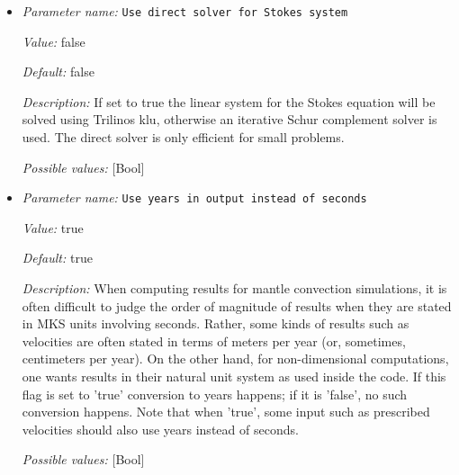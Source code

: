 \begin{itemize}
{\it Value:} false


{\it Default:} false


{\it Description:} Mantle convection simulations are often focused on convection dominated systems. However, these codes can also be used to investigate systems where heat conduction plays a dominant role. This parameter indicates whether the simulator should also use heat conduction in determining the length of each time step.


{\it Possible values:} [Bool]
\item {\it Parameter name:} {\tt Use direct solver for Stokes system}
\label{parameters:Use direct solver for Stokes system}


{\it Value:} false


{\it Default:} false


{\it Description:} If set to true the linear system for the Stokes equation will be solved using Trilinos klu, otherwise an iterative Schur complement solver is used. The direct solver is only efficient for small problems.


{\it Possible values:} [Bool]
\item {\it Parameter name:} {\tt Use years in output instead of seconds}
\label{parameters:Use years in output instead of seconds}


{\it Value:} true


{\it Default:} true


{\it Description:} When computing results for mantle convection simulations, it is often difficult to judge the order of magnitude of results when they are stated in MKS units involving seconds. Rather, some kinds of results such as velocities are often stated in terms of meters per year (or, sometimes, centimeters per year). On the other hand, for non-dimensional computations, one wants results in their natural unit system as used inside the code. If this flag is set to 'true' conversion to years happens; if it is 'false', no such conversion happens. Note that when 'true', some input such as prescribed velocities should also use years instead of seconds.


{\it Possible values:} [Bool]
\end{itemize}



